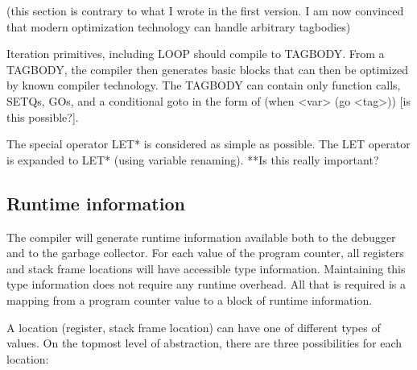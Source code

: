 \documentclass{article}
\begin{document}
(this section is contrary to what I wrote in the first version.  I am
now convinced that modern optimization technology can handle arbitrary
tagbodies)

Iteration primitives, including LOOP should compile to TAGBODY.  From
a TAGBODY, the compiler then generates basic blocks that can then be
optimized by known compiler technology.  The TAGBODY can contain only
function calls, SETQs, GOs, and a conditional goto in the form of
(when <var> (go <tag>)) [is this possible?].

The special operator LET* is considered as simple as possible.  The
LET operator is expanded to LET* (using variable renaming).  **Is this
really important?

\subsection{Runtime information}

The compiler will generate runtime information available both to the
debugger and to the garbage collector.  For each value of the program
counter, all registers and stack frame locations will have accessible
type information.  Maintaining this type information does not require
any runtime overhead.  All that is required is a mapping from a
program counter value to a block of runtime information. 

A location (register, stack frame location) can have one of different
types of values.  On the topmost level of abstraction, there are three
possibilities for each location:
\end{document}
